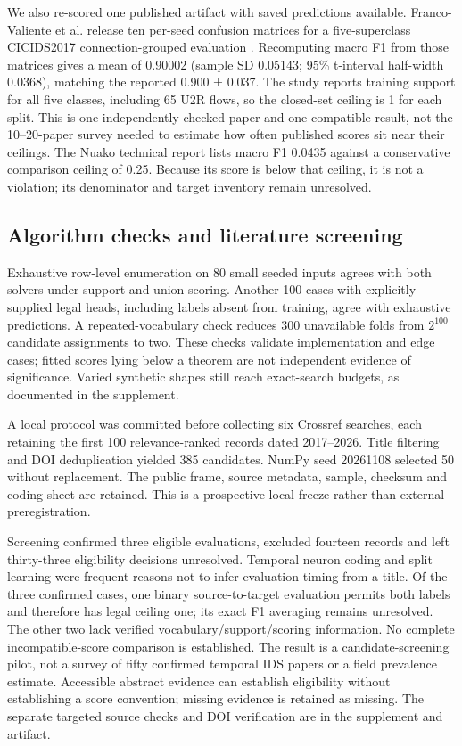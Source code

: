 \documentclass[namedate,webpdf,contemporary,large]{TBench-template}
\begin{document}
We also re-scored one published artifact with saved predictions available. Franco-Valiente et al. release ten per-seed confusion matrices for a five-superclass CICIDS2017 connection-grouped evaluation \cite{francovaliente2026}. Recomputing macro F1 from those matrices gives a mean of 0.90002 (sample SD 0.05143; 95\% t-interval half-width 0.0368), matching the reported 0.900 ± 0.037. The study reports training support for all five classes, including 65 U2R flows, so the closed-set ceiling is 1 for each split. This is one independently checked paper and one compatible result, not the 10--20-paper survey needed to estimate how often published scores sit near their ceilings. The Nuako technical report lists macro F1 0.0435 against a conservative comparison ceiling of 0.25. Because its score is below that ceiling, it is not a violation; its denominator and target inventory remain unresolved.

\subsection{Algorithm checks and literature screening}
Exhaustive row-level enumeration on 80 small seeded inputs agrees with both solvers under support and union scoring. Another 100 cases with explicitly supplied legal heads, including labels absent from training, agree with exhaustive predictions. A repeated-vocabulary check reduces 300 unavailable folds from \(2^{100}\) candidate assignments to two. These checks validate implementation and edge cases; fitted scores lying below a theorem are not independent evidence of significance. Varied synthetic shapes still reach exact-search budgets, as documented in the supplement.

A local protocol was committed before collecting six Crossref searches, each retaining the first 100 relevance-ranked records dated 2017--2026. Title filtering and DOI deduplication yielded 385 candidates. NumPy seed 20261108 selected 50 without replacement. The public frame, source metadata, sample, checksum and coding sheet are retained. This is a prospective local freeze rather than external preregistration.

Screening confirmed three eligible evaluations, excluded fourteen records and left thirty-three eligibility decisions unresolved. Temporal neuron coding and split learning were frequent reasons not to infer evaluation timing from a title. Of the three confirmed cases, one binary source-to-target evaluation permits both labels and therefore has legal ceiling one; its exact F1 averaging remains unresolved. The other two lack verified vocabulary/support/scoring information. No complete incompatible-score comparison is established. The result is a candidate-screening pilot, not a survey of fifty confirmed temporal IDS papers or a field prevalence estimate. Accessible abstract evidence can establish eligibility without establishing a score convention; missing evidence is retained as missing. The separate targeted source checks and DOI verification are in the supplement and artifact.
\end{document}
